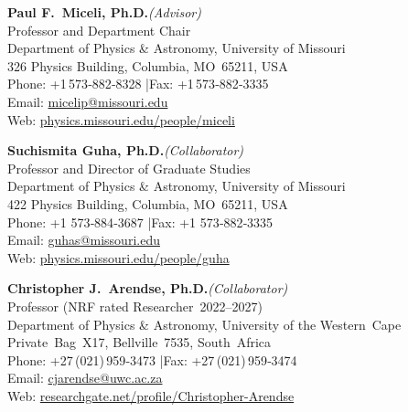 

\noindent
\begin{minipage}[t]{0.48\textwidth}
\textbf{Paul F.\ Miceli, Ph.D.}\quad\textit{(Advisor)}\\
Professor and Department Chair\\
Department of Physics \& Astronomy, University of Missouri\\
326 Physics Building, Columbia, MO 65211, USA\\
Phone: +1 573‑882‑8328 \quad|\quad Fax: +1 573‑882‑3335\\
Email: \href{mailto:micelip@missouri.edu}{micelip@missouri.edu}\\
Web: \href{https://physics.missouri.edu/people/miceli}{physics.missouri.edu/people/miceli}
\end{minipage}\hfill
\begin{minipage}[t]{0.48\textwidth}
\textbf{Suchismita Guha, Ph.D.}\quad\textit{(Collaborator)}\\
Professor and Director of Graduate Studies\\
Department of Physics \& Astronomy, University of Missouri\\
422 Physics Building, Columbia, MO 65211, USA\\
Phone: +1 573‑884‑3687 \quad|\quad Fax: +1 573‑882‑3335\\
Email: \href{mailto:guhas@missouri.edu}{guhas@missouri.edu}\\
Web: \href{https://physics.missouri.edu/people/guha}{physics.missouri.edu/people/guha}
\end{minipage}

\vspace{1em}

\begin{center}
\begin{minipage}{0.6\textwidth}
\centering
\textbf{Christopher J.\ Arendse, Ph.D.}\quad\textit{(Collaborator)}\\
Professor (NRF rated Researcher 2022–2027)\\
Department of Physics \& Astronomy, University of the Western Cape\\
Private Bag X17, Bellville 7535, South Africa\\
Phone: +27 (021) 959‑3473 \quad|\quad Fax: +27 (021) 959‑3474\\
Email: \href{mailto:cjarendse@uwc.ac.za}{cjarendse@uwc.ac.za}\\
Web: \href{https://www.researchgate.net/profile/Christopher-Arendse}{researchgate.net/profile/Christopher-Arendse}
\end{minipage}
\end{center}
